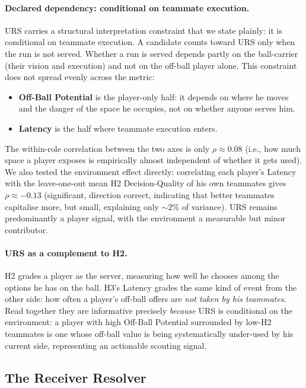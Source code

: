 \documentclass[12pt,a4paper]{article}
\begin{document}
\paragraph{Declared dependency: conditional on teammate execution.}
URS carries a structural interpretation constraint that we state plainly: it is conditional on teammate execution.
A candidate counts toward URS only when the run is not served. Whether a run is served depends partly on the ball-carrier (their vision and execution) and not on the off-ball player alone.
This constraint does not spread evenly across the metric:
\begin{itemize}
    \item \textbf{Off-Ball Potential} is the player-only half: it depends on where he moves and the danger of the space he occupies, not on whether anyone serves him.
    \item \textbf{Latency} is the half where teammate execution enters.
\end{itemize}

The within-role correlation between the two axes is only $\rho \approx 0.08$ (i.e., how much space a player exposes is empirically almost independent of whether it gets used).
We also tested the environment effect directly: correlating each player's Latency with the leave-one-out mean H2 Decision-Quality of his own teammates gives $\rho \approx -0.13$ (significant, direction correct, indicating that better teammates capitalise more, but small, explaining only ${\sim}2\%$ of variance).
URS remains predominantly a player signal, with the environment a measurable but minor contributor.

\paragraph{URS as a complement to H2.}
H2 grades a player as the server, measuring how well he chooses among the options he has on the ball.
H3's Latency grades the same kind of event from the other side: how often a player's off-ball offers are \emph{not taken by his teammates}.
Read together they are informative precisely \emph{because} URS is conditional on the environment: a player with high Off-Ball Potential surrounded by low-H2 teammates is one whose off-ball value is being systematically under-used by his current side, representing an actionable scouting signal.

\subsection{The Receiver Resolver}\label{sec:resolver}
\end{document}
